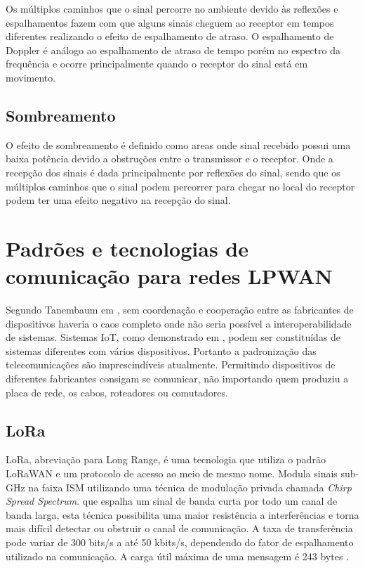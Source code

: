 Os múltiplos caminhos que o sinal percorre no ambiente devido às reflexões e espalhamentos fazem com que alguns sinais cheguem ao receptor em tempos diferentes realizando o efeito de espalhamento de atraso. O espalhamento de Doppler é análogo ao espalhamento de atraso de tempo porém no espectro da frequência e ocorre principalmente quando o receptor do sinal está em movimento.


\subsection*{Sombreamento}
O efeito de sombreamento é definido como areas onde sinal recebido possui uma baixa potência devido a obstruções entre o transmissor e o receptor. Onde a recepção dos sinais é dada principalmente por reflexões do sinal, sendo que os múltiplos caminhos que o sinal podem percorrer para chegar no local do receptor podem ter uma efeito negativo na recepção do sinal.


\section{Padrões e tecnologias de comunicação para redes LPWAN}
\label{padrõesSF}
Segundo Tanembaum em \cite{tanembaum2011}, sem coordenação e cooperação entre as fabricantes de dispositivos haveria o caos completo onde não seria possível a interoperabilidade de sistemas. Sistemas IoT, como demonstrado em \cite{sotres2017practical}, podem ser constituídas de sistemas diferentes com vários dispositivos. Portanto a padronização das telecomunicações são imprescindíveis atualmente. Permitindo dispositivos de diferentes fabricantes consigam se comunicar, não importando quem produziu a placa de rede, os cabos, roteadores ou comutadores.

\subsection{LoRa}
LoRa, abreviação para Long Range, é uma tecnologia que utiliza o padrão LoRaWAN e um protocolo de acesso ao meio de mesmo nome. Modula sinais sub-GHz na faixa ISM utilizando uma técnica de modulação  privada chamada \emph{Chirp Spread Spectrum}. que espalha um sinal de banda curta por todo um canal de banda larga, esta técnica possibilita uma maior resistência a interferências e torna mais difícil detectar ou obstruir o canal de comunicação. A taxa de transferência pode variar de 300 bits/s a até 50 kbits/s, dependendo do fator de espalhamento utilizado na comunicação. A carga útil máxima de uma mensagem é 243 bytes \cite{mekki2019comparative}.

